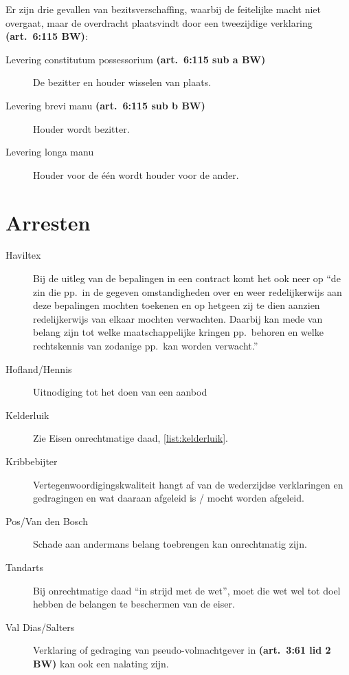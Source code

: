 \documentclass[a4paper]{article}
\newcommand{\art}[1]{\textbf{(art.~#1 BW)}\xspace}
\begin{document}
Er zijn drie gevallen van bezitsverschaffing, waarbij de feitelijke macht niet
overgaat, maar de overdracht plaatsvindt door een tweezijdige verklaring
\art{6:115}:
\begin{description}

  \item[Levering constitutum possessorium \art{6:115 sub a}] De bezitter en
    houder wisselen van plaats.

  \item[Levering brevi manu \art{6:115 sub b}] Houder wordt bezitter.

  \item[Levering longa manu] Houder voor de \'e\'en wordt houder voor de
    ander.

\end{description}


\section{Arresten}

\begin{description}

  \item[Haviltex] Bij de uitleg van de bepalingen in een contract komt het ook
    neer op ``de zin die pp.~in de gegeven omstandigheden over en weer
    redelijkerwijs aan deze bepalingen mochten toekenen en op hetgeen zij te
    dien aanzien redelijkerwijs van elkaar mochten verwachten. Daarbij kan
    mede van belang zijn tot welke maatschappelijke kringen pp.~behoren en
    welke rechtskennis van zodanige pp.~kan worden verwacht.''

  \item[Hofland/Hennis] Uitnodiging tot het doen van een aanbod

  \item[Kelderluik] Zie Eisen onrechtmatige daad, \ref{list:kelderluik}.

  \item[Kribbebijter] Vertegenwoordigingskwaliteit hangt af van de wederzijdse
    verklaringen en gedragingen en wat daaraan afgeleid is / mocht worden
    afgeleid.

  \item[Pos/Van den Bosch] Schade aan andermans belang toebrengen kan
    onrechtmatig zijn.

  \item[Tandarts] Bij onrechtmatige daad ``in strijd met de wet'', moet die
    wet wel tot doel hebben de belangen te beschermen van de eiser.

  \item[Val Dias/Salters] Verklaring of gedraging van pseudo-volmachtgever in
    \art{3:61 lid 2} kan ook een nalating zijn.

\end{description}
\end{document}
